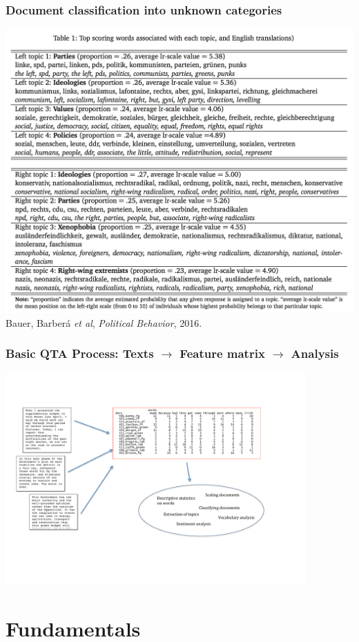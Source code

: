 \documentclass[notes=hide]{beamer}
\begin{document}
\begin{frame}
	\frametitle{Document classification into unknown categories}
	\includegraphics[width=.9\textwidth]{figures/pobe1.png}\\
	Bauer, Barber\'{a} \textit{et al}, \textit{Political Behavior}, 2016.
\end{frame}



\begin{frame}
	\frametitle{Basic QTA Process: Texts $\rightarrow$ Feature matrix $\rightarrow$ Analysis}
	\includegraphics[width=11.5cm]{figures/workflow.pdf}
\end{frame}


\section{Fundamentals}
\end{document}
